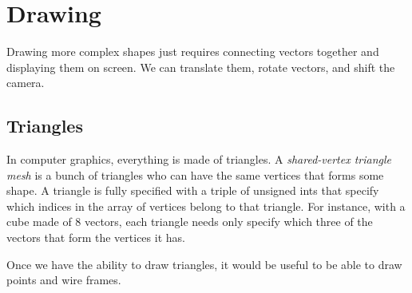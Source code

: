 \section{Drawing}

Drawing more complex shapes just requires connecting
vectors together and displaying them on screen. We can
translate them, rotate vectors, and shift the camera.

\subsection{Triangles}

In computer graphics, everything is made of triangles.
A \emph{shared-vertex triangle mesh} is a bunch of triangles
who can have the same vertices that forms some shape. A
triangle is fully specified with a triple of unsigned ints
that specify which indices in the array of vertices belong
to that triangle. For instance, with a cube made of 8 vectors,
each triangle needs only specify which three of the vectors
that form the vertices it has.

Once we have the ability to draw triangles, it would be
useful to be able to draw points and wire frames.